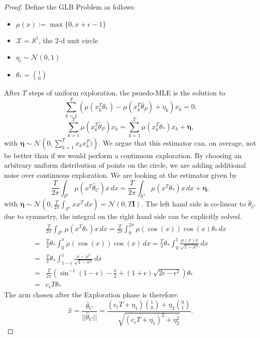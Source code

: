 \documentclass[twoside]{article} \usepackage{aistats2017}
\begin{document}
\begin{proof}
    
    Define the GLB Problem as follows:
    \begin{itemize}
    \item $\mu(x) := \max\{0, x+\epsilon-1\}$
    \item $\mathcal{X} = \mathcal{S}^1$, the $2$-d unit circle
    \item $\eta_i\sim \mathcal{N}(0,1)$
    \item $\theta_* = \binom{1}{0}
    $
    \end{itemize}
    After $T$ steps of uniform exploration, the psuedo-MLE is the solution to
    $$\sum_{k=1}^T\left(\mu(x_k^T\theta_*)-\mu(x_k^T\hat{\theta}_P)+\eta_k\right)x_k=0.$$
    $$\sum_{k=1}^T\mu(x_k^T\hat{\theta}_P)x_k = \sum_{k=1}^T\mu(x_k^T\theta_*)x_k + \boldsymbol{\eta},$$
    with $\boldsymbol{\eta}\sim \mathcal{N}\left(0,\sum_{k=1}^Tx_kx_k^T)\right)$.
    We argue that this estimator can, on average, not be better than if we would perform a continuous exploration.
    By choosing an arbitrary uniform distribution of points on the circle, we are adding additional noise over continuous exploration. We are looking at the estimator given by
    $$\frac{T}{2\pi}\int_{\mathcal{S}^1}\mu(x^T\hat{\theta}_C)x\,dx = \frac{T}{2\pi}\int_{\mathcal{S}^1}\mu(x^T\theta_*)x\,dx + \boldsymbol{\eta},$$
    with $\boldsymbol{\eta}\sim \mathcal{N}(0,\frac{T}{2\pi}\int_{\mathcal{S}^1}xx^T\,dx)=\mathcal{N}(0,T\mathbf{I})$.
    The left hand side is co-linear to $\hat{\theta}_C$ due to symmetry, the integral on the right hand side can be explicitly solved.
    \begin{align*}
    &\frac{T}{2\pi}\int_{\mathcal{S}^1}\mu(x^T\theta_*)x\,dx = \frac{T}{2\pi}\int_{0}^{2\pi}\mu(\cos(x))\cos(x)\theta_*\,dx \\
    =&\frac{T}{\pi}\theta_*\int_{0}^{\pi}\mu(\cos(x))\cos(x)\,dx=\frac{T}{\pi}\theta_*\int_{0}^{1}\frac{\mu(x)x}{\sqrt{1-x^2}}\,dx\\
    =&\frac{T}{\pi}\theta_*\int_{1-\epsilon}^{1}\frac{x-x^2}{\sqrt{1-x^2}}\,dx\\
    =&\frac{T}{2\pi}\left(\sin^{-1}(1-\epsilon)-\frac{\pi}{2}+(1+\epsilon)\sqrt{2\epsilon-\epsilon^2}\right)\theta_*\\
    =&c_\epsilon T\theta_*
    \end{align*}
    The arm chosen after the Exploration phase is therefore:
    $$\hat{x} = \frac{\hat{\theta}_C}{||\hat{\theta}_C||}=\frac{(c_\epsilon T+\eta_1)\binom{1}{0}+\eta_2\binom{0}{1}}{\sqrt{(c_\epsilon T+\eta_1)^2+\eta_2^2}}.$$

\end{proof}
\end{document}
